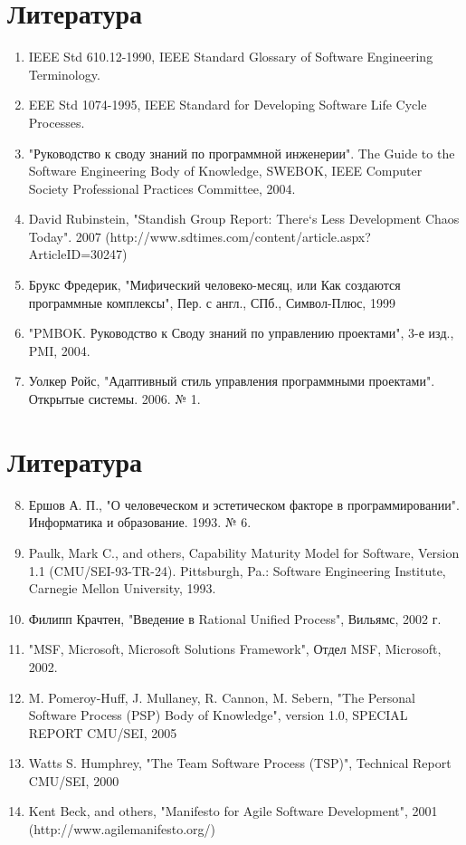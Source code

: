 \documentclass{beamer}
\begin{document}
\section*{Литература}
\begin{frame}   
\begin{enumerate}
\item IEEE Std 610.12-1990, IEEE Standard Glossary of Software Engineering Terminology.
\item EEE Std 1074-1995, IEEE Standard for Developing Software Life Cycle Processes.
\item "Руководство к своду знаний по программной инженерии". The Guide to the Software Engineering Body of Knowledge, SWEBOK, IEEE Computer Society Professional Practices Committee, 2004.
\item David Rubinstein, "Standish Group Report: There‘s Less Development Chaos Today". 2007 (http://www.sdtimes.com/content/article.aspx?ArticleID=30247)
\item Брукс Фредерик, "Мифический человеко-месяц, или Как создаются программные комплексы", Пер. с англ., СПб., Символ-Плюс, 1999 
\item "PMBOK. Руководство к Своду знаний по управлению проектами", 3-е изд., PMI, 2004.
\item Уолкер Ройс, "Адаптивный стиль управления программными проектами". Открытые системы. 2006. № 1.
\end{enumerate}
\end{frame}


\section*{Литература}
\begin{frame}   
\begin{enumerate}
\setcounter{enumi}{7}
\item Ершов А. П., "О человеческом и эстетическом факторе в программировании". Информатика и образование. 1993. № 6.
\item Paulk, Mark C., and others, Capability Maturity Model for Software, Version 1.1 (CMU/SEI-93-TR-24). Pittsburgh, Pa.: Software Engineering Institute, Carnegie Mellon University, 1993.
\item Филипп Крачтен, "Введение в Rational Unified Process", Вильямс, 2002 г.
\item "MSF, Microsoft, Microsoft Solutions Framework", Отдел MSF, Microsoft, 2002.
\item M. Pomeroy-Huff, J. Mullaney, R. Cannon, M. Sebern, "The Personal Software Process (PSP) Body of Knowledge", version 1.0, SPECIAL REPORT CMU/SEI, 2005
\item Watts S. Humphrey, "The Team Software Process (TSP)", Technical Report CMU/SEI, 2000
\item Kent Beck, and others, "Manifesto for Agile Software Development", 2001 (http://www.agilemanifesto.org/)
\end{enumerate}
\end{frame}
\end{document}
